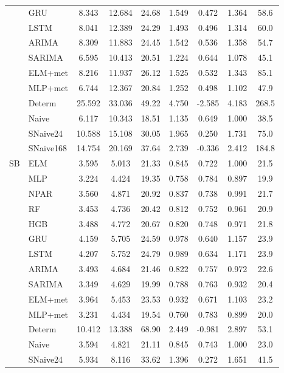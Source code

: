 \begin{table}[H]
{\begin{tabular}{llccccccc}
 & GRU & 8.343 & 12.684 & 24.68 & 1.549 & 0.472 & 1.364 & 58.6 \\
 & LSTM & 8.041 & 12.389 & 24.29 & 1.493 & 0.496 & 1.314 & 60.0 \\
 & ARIMA & 8.309 & 11.883 & 24.45 & 1.542 & 0.536 & 1.358 & 54.7 \\
 & SARIMA & 6.595 & 10.413 & 20.51 & 1.224 & 0.644 & 1.078 & 45.1 \\
 & ELM+met & 8.216 & 11.937 & 26.12 & 1.525 & 0.532 & 1.343 & 85.1 \\
 & MLP+met & 6.744 & 12.367 & 20.84 & 1.252 & 0.498 & 1.102 & 47.9 \\
 & Determ & 25.592 & 33.036 & 49.22 & 4.750 & -2.585 & 4.183 & 268.5 \\
 & Naive & 6.117 & 10.343 & 18.51 & 1.135 & 0.649 & 1.000 & 38.5 \\
 & SNaive24 & 10.588 & 15.108 & 30.05 & 1.965 & 0.250 & 1.731 & 75.0 \\
 & SNaive168 & 14.754 & 20.169 & 37.64 & 2.739 & -0.336 & 2.412 & 184.8 \\
\midrule
SB & ELM & 3.595 & 5.013 & 21.33 & 0.845 & 0.722 & 1.000 & 21.5 \\
 & MLP & 3.224 & 4.424 & 19.35 & 0.758 & 0.784 & 0.897 & 19.9 \\
 & NPAR & 3.560 & 4.871 & 20.92 & 0.837 & 0.738 & 0.991 & 21.7 \\
 & RF & 3.453 & 4.736 & 20.42 & 0.812 & 0.752 & 0.961 & 20.9 \\
 & HGB & 3.488 & 4.772 & 20.67 & 0.820 & 0.748 & 0.971 & 21.8 \\
 & GRU & 4.159 & 5.705 & 24.59 & 0.978 & 0.640 & 1.157 & 23.9 \\
 & LSTM & 4.207 & 5.752 & 24.79 & 0.989 & 0.634 & 1.171 & 23.9 \\
 & ARIMA & 3.493 & 4.684 & 21.46 & 0.822 & 0.757 & 0.972 & 22.6 \\
 & SARIMA & 3.349 & 4.629 & 19.99 & 0.788 & 0.763 & 0.932 & 20.4 \\
 & ELM+met & 3.964 & 5.453 & 23.53 & 0.932 & 0.671 & 1.103 & 23.2 \\
 & MLP+met & 3.231 & 4.434 & 19.54 & 0.760 & 0.783 & 0.899 & 20.0 \\
 & Determ & 10.412 & 13.388 & 68.90 & 2.449 & -0.981 & 2.897 & 53.1 \\
 & Naive & 3.594 & 4.821 & 21.11 & 0.845 & 0.743 & 1.000 & 23.0 \\
 & SNaive24 & 5.934 & 8.116 & 33.62 & 1.396 & 0.272 & 1.651 & 41.5 \\

\end{tabular}}
\end{table}

